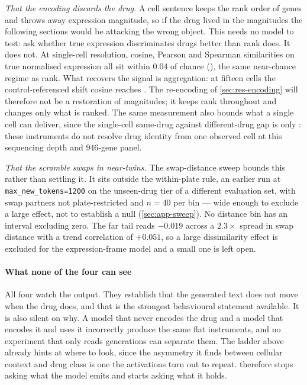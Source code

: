   \emph{That the encoding discards the drug.} A cell sentence keeps the rank order
  of genes and throws away expression magnitude, so if the drug lived in the
  magnitudes the following sections would be attacking the wrong object. This needs
  no model to test: ask whether true expression discriminates drugs better than
  rank does. It does not. At single-cell resolution, cosine, Pearson and Spearman
  similarities on true normalised expression all sit within $0.04$ of chance
  (), the same near-chance regime as rank.
  What recovers the signal is aggregation: at fifteen cells the control-referenced
  shift cosine reaches . The re-encoding of
  \cref{sec:res-encoding} will therefore not be a restoration of magnitudes; it
  keeps rank throughout and changes only what is ranked. The same measurement also
  bounds what a single cell can deliver, since the single-cell same-drug against
  different-drug gap is only : these instruments do not
  resolve drug identity from one observed cell at this sequencing depth and
  $946$-gene panel.
  
  \emph{That the scramble swaps in near-twins.} The swap-distance sweep bounds this
  rather than settling it. It sits outside the within-plate rule, an earlier run at
  \texttt{max\_new\_tokens=1200} on the unseen-drug tier of a different evaluation
  set, with swap partners not plate-restricted and $n = 40$ per bin --- wide enough
  to exclude a large effect, not to establish a null (\cref{sec:app-sweep}). No
  distance bin has an interval excluding zero. The far tail reads $-0.019$ across a
  $2.3\times$ spread in swap distance with a trend correlation of $+0.051$, so a
  large dissimilarity effect is excluded for the expression-frame model and a small
  one is left open.
  
  \paragraph{What none of the four can see} All four watch the output. They
  establish that the generated text does not move when the drug does, and that is
  the strongest behavioural statement available. It is also silent on why. A model
  that never encodes the drug and a model that encodes it and uses it incorrectly
  produce the same flat instruments, and no experiment that only reads generations
  can separate them. The ladder above already hints at where to look, since the
  asymmetry it finds between cellular context and drug class is one the activations
  turn out to repeat.  therefore stops asking what the
  model emits and starts asking what it holds.

